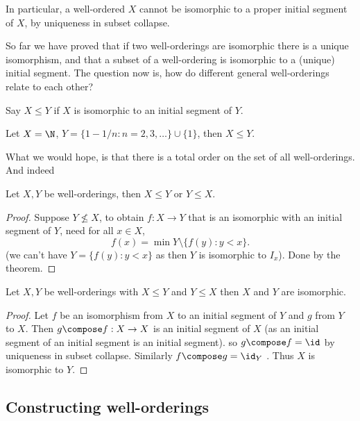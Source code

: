 \documentclass[a4paper]{article}
\begin{document}
In particular, a well-ordered \(X\) cannot be isomorphic to a proper initial segment of \(X\), by uniqueness in subset collapse.

So far we have proved that if two well-orderings are isomorphic there is a unique isomorphism, and that a subset of a well-ordering is isomorphic to a (unique) initial segment. The question now is, how do different general well-orderings relate to each other?

\begin{definition}
  Say \(X \leq Y\) if \(X\) is isomorphic to an initial segment of \(Y\).
\end{definition}

\begin{eg}
  Let \(X = \N\), \(Y = \{1 - 1/n: n = 2, 3, \dots\} \cup \{1\}\), then \(X \leq Y\).
\end{eg}

What we would hope, is that there is a total order on the set of all well-orderings. And indeed

\begin{theorem}
  Let \(X, Y\) be well-orderings, then \(X \leq Y\) or \(Y \leq X\).
\end{theorem}

\begin{proof}
  Suppose \(Y \nleq X\), to obtain \(f: X \to Y\) that is an isomorphic with an initial segment of \(Y\), need for all \(x \in X\),
  \[
    f(x) = \min Y \setminus \{f(y): y < x\}.
  \]
  (we can't have \(Y = \{f(y): y < x\}\) as then \(Y\) is isomorphic to \(I_x\)). Done by the theorem.
\end{proof}

\begin{proposition}
  Let \(X, Y\) be well-orderings with \(X \leq Y\) and \(Y \leq X\) then \(X\) and \(Y\) are isomorphic.
\end{proposition}

\begin{proof}
  Let \(f\) be an isomorphism from \(X\) to an initial segment of \(Y\) and \(g\) from \(Y\) to \(X\). Then \(g \compose f: X \to X\) is an initial segment of \(X\) (as an initial segment of an initial segment is an initial segment). so \(g \compose f = \id\) by uniqueness in subset collapse. Similarly \(f \compose g = \id_Y\) . Thus \(X\) is isomorphic to \(Y\).
\end{proof}

\subsection{Constructing well-orderings}
\end{document}
